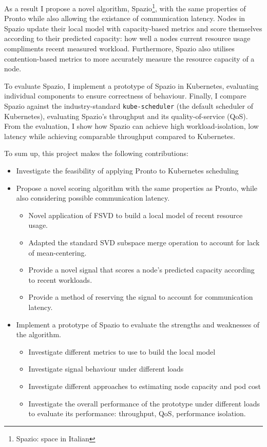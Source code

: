 As a result I propose a novel algorithm, Spazio\footnote{Spazio: space in
Italian}, with the same properties of Pronto while also allowing the existance
of communication latency. Nodes in Spazio update their local model with
capacity-based metrics and score themselves according to their predicted
capacity: how well a nodes current resource usage compliments recent measured
workload. Furthermore, Spazio also utilises contention-based metrics to more
accurately measure the resource capacity of a node.

To evaluate Spazio, I implement a prototype of Spazio in Kubernetes, evaluating
individual components to ensure correctness of behaviour. Finally, I compare
Spazio against the industry-standard \verb|kube-scheduler| (the default
scheduler of Kubernetes), evaluating Spazio's throughput and its
quality-of-service (QoS). From the evaluation, I show how Spazio can achieve
high workload-isolation, low latency while achieving comparable throughput
compared to Kubernetes.

To sum up, this project makes the following contributions:
\begin{itemize}
\item Investigate the feasibility of applying Pronto to Kubernetes scheduling
\item Propose a novel scoring algorithm with the same properties as Pronto,
    while also considering possible communication latency.
    \begin{itemize}
        \item Novel application of FSVD to build a local model of recent
            resource usage.
        \item Adapted the standard SVD subspace merge operation to account for
            lack of mean-centering.
        \item Provide a novel signal that scores a node's predicted capacity
            according to recent workloads.
        \item Provide a method of reserving the signal to account for
            communication latency.
    \end{itemize}
\item Implement a prototype of Spazio to evaluate the strengths and weaknesses
    of the algorithm.
    \begin{itemize}
        \item Investigate different metrics to use to build the local model
        \item Investigate signal behaviour under different loads
        \item Investigate different approaches to estimating node capacity and
            pod cost
        \item Investigate the overall performance of the prototype under
            different loads to evaluate its performance: throughput, QoS,
            performance isolation.
    \end{itemize}
\end{itemize}



